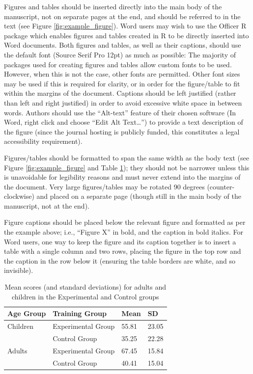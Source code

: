 \documentclass{ldr-article}
\begin{document}
Figures and tables should be inserted directly into the main body of the manuscript, not on separate pages at the end, and should be referred to in the text (see Figure \ref{fig:example_figure}). Word users may wish to use the Officer R package which enables figures and tables created in R to be directly inserted into Word documents. Both figures and tables, as well as their captions, should use the default font (Source Serif Pro 12pt) as much as possible: The majority of packages used for creating figures and tables allow custom fonts to be used. However, when this is not the case, other fonts are permitted. Other font sizes may be used if this is required for clarity, or in order for the figure/table to fit within the margins of the document.  Captions should be left justified (rather than left and right justified) in order to avoid excessive white space in between words. Authors should use the “Alt-text” feature of their chosen software (In Word, right click and choose “Edit Alt Text…”) to provide a text description of the figure (since the journal hosting is publicly funded, this constitutes a legal accessibility requirement). 

Figures/tables should be formatted to span the same width as the body text (see Figure \ref{fig:example_figure} and Table \ref{tab:example_table}); they should not be narrower unless this is unavoidable for legibility reasons and must never extend into the margins of the document. Very large figures/tables may be rotated 90 degrees (counter-clockwise) and placed on a separate page (though still in the main body of the manuscript, not at the end).

Figure captions should be placed below the relevant figure and formatted as per the example above; i.e., “Figure X” in bold, and the caption in bold italics. For Word users, one way to keep the figure and its caption together is to insert a table with a single column and two rows, placing the figure in the top row and the caption in the row below it (ensuring the table borders are white, and so invisible).

\begin{table}[htb]
    \caption{Mean scores (and standard deviations) for adults and children in the Experimental and Control groups\label{tab:example_table}}
    \centering
    \begin{tabular}{llll}
        Age Group   & Training Group & Mean & SD \\
        \hline
        Children    & Experimental Group & 55.81 & 23.05 \\
                    & Control Group & 35.25 & 22.28 \\
        \hline
        Adults      & Experimental Group & 67.45 & 15.84 \\
                    & Control Group & 40.41 & 15.04 \\
    \end{tabular}
\end{table}
\end{document}
